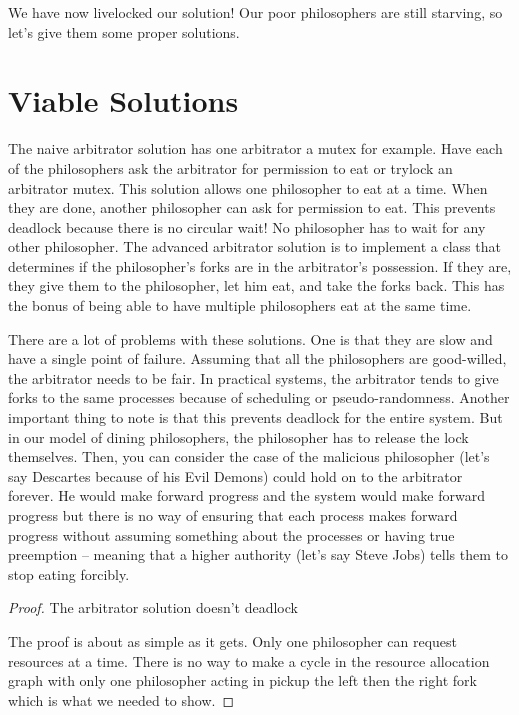 We have now livelocked our solution! Our poor philosophers are still starving, so let's give them some proper solutions.

\section{Viable Solutions}

The naive arbitrator solution has one arbitrator a mutex for example.
Have each of the philosophers ask the arbitrator for permission to eat or trylock an arbitrator mutex.
This solution allows one philosopher to eat at a time.
When they are done, another philosopher can ask for permission to eat.
This prevents deadlock because there is no circular wait! No philosopher has to wait for any other philosopher.
The advanced arbitrator solution is to implement a class that determines if the philosopher's forks are in the arbitrator's possession.
If they are, they give them to the philosopher, let him eat, and take the forks back.
This has the bonus of being able to have multiple philosophers eat at the same time.

There are a lot of problems with these solutions.
One is that they are slow and have a single point of failure.
Assuming that all the philosophers are good-willed, the arbitrator needs to be fair.
In practical systems, the arbitrator tends to give forks to the same processes because of scheduling or pseudo-randomness.
Another important thing to note is that this prevents deadlock for the entire system.
But in our model of dining philosophers, the philosopher has to release the lock themselves.
Then, you can consider the case of the malicious philosopher (let's say Descartes because of his Evil Demons) could hold on to the arbitrator forever.
He would make forward progress and the system would make forward progress but there is no way of ensuring that each process makes forward progress without assuming something about the processes or having true preemption -- meaning that a higher authority (let's say Steve Jobs) tells them to stop eating forcibly.


\begin{proof} The arbitrator solution doesn't deadlock
	
	The proof is about as simple as it gets. Only one philosopher can request resources at a time. There is no way to make a cycle in the resource allocation graph with only one philosopher acting in pickup the left then the right fork which is what we needed to show.
	
\end{proof}

